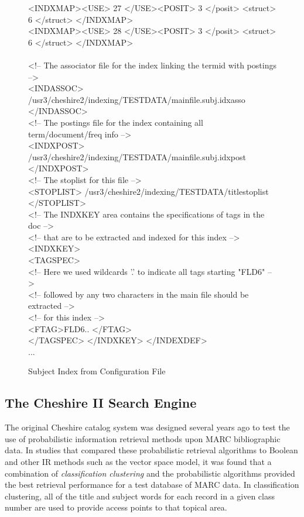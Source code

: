 \begin{figure}[p]
\begin{center}
{{{{\begin{tabbing}
<INDXMAP><USE> 27 </USE><POSIT> 3 </posit> <struct> 6 </struct> </INDXMAP>\\
<INDXMAP><USE> 28 </USE><POSIT> 3 </posit> <struct> 6 </struct> </INDXMAP>\\
\\
<!-- The associator file for the index linking the termid with postings -->\\
<INDASSOC> /usr3/cheshire2/indexing/TESTDATA/mainfile.subj.idxasso </INDASSOC>\\
<!-- The postings file for the index containing all term/document/freq info -->\\
<INDXPOST> /usr3/cheshire2/indexing/TESTDATA/mainfile.subj.idxpost </INDXPOST>\\
<!-- The stoplist for this file -->\\
<STOPLIST> /usr3/cheshire2/indexing/TESTDATA/titlestoplist </STOPLIST>\\
<!-- The INDXKEY area contains the specifications of tags in the doc -->\\
<!-- that are to be extracted and indexed for this index    -->\\
<INDXKEY>\\
<TAGSPEC>\\
<!-- Here we used wildcards '.' to indicate all tags starting "FLD6"     -->\\
<!-- followed by any two characters in the main file should be extracted -->\\
<!-- for this index -->\\
<FTAG>FLD6.. </FTAG> \\
</TAGSPEC> </INDXKEY> </INDEXDEF>\\
...\\
\end{tabbing}
}}}}
\caption{Subject Index from Configuration File}
\label{sgml.subjindex}
\end{center}
\end{figure}


\subsection{The Cheshire II Search Engine}

The original Cheshire catalog system was designed several years ago to
test the use of probabilistic information retrieval methods upon MARC
bibliographic data. In studies that compared these probabilistic
retrieval algorithms to Boolean and other IR methods such as the
vector space model, it was found that a combination of {\em
classification clustering} and the probabilistic algorithms provided
the best retrieval performance for a test database of MARC
data\cite{CLASSCLUS,EVAL}. In classification clustering, all of the
title and subject words for each record in a given class number are
used to provide access points to that topical area.

